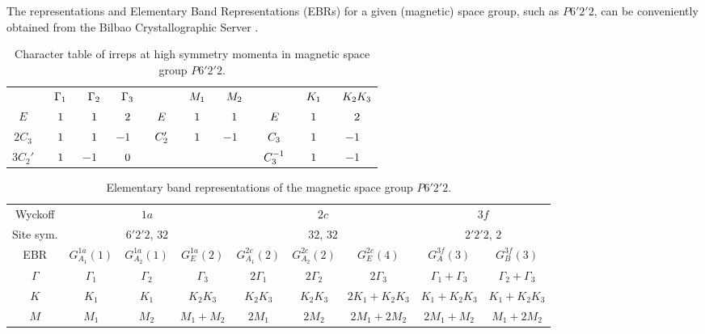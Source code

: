 \documentclass[12pt]{report}
\begin{document}
The representations and Elementary Band Representations (EBRs) for a given (magnetic) space group, such as \( P6'2'2 \), can be conveniently obtained from the Bilbao Crystallographic Server \cite{bilbao_1, bilbao_2}.

\begin{table}[H]
\caption{Character table of irreps at high symmetry momenta in magnetic space group $P6'2'2$.}
\centering
\begin{tabular} { c c c c | c c c | c c c }
\cline{1-10}
$\P$ & $\P \Gamma_1$ & $\P \Gamma_2$ & $\P \Gamma_3$ & $\P$ & $\P M_1$ & $\P M_2$ & $\P$ & $\P K_1$ & $\P K_2K_3$ \\
\cline{1-10}
$E$ & $\P1$ & $\P1$ & $\P2$ & $\P E$ & $\P1$ & $\P1$ & $\P E$ & $\P1$ & $\P2$ \\
$2 C_3$ & $\P1$ & $\P1$ & $ -1$ & $\P C_2'$ & $\P1$ & $ -1$ & $\P C_3$ & $\P1$ & $ -1$ \\
$3 C_2'$ & $\P1$ & $ -1$ & $\P0$ & $\P$ & $\P$ & $\P$ & $\P C_3^{-1}$ & $\P1$ & $-1$ \\
\cline{1-10}
\end{tabular}
\label{tab:P6'2'2}
\end{table}

\begin{table}[H]
\footnotesize
\caption{Elementary band representations of the magnetic space group $P6'2'2$.}
\centering
\begin{tabular}{|c|c|c|c|c|c|c|c|c|}
\hline
Wyckoff & \multicolumn{3}{c|}{$1a$} & \multicolumn{3}{c|}{$2c$} & \multicolumn{2}{c|}{$3f$} \\
\cline{1-9}
Site sym. & \multicolumn{3}{c|}{$6'2'2$, $32$} & \multicolumn{3}{c|}{$32$, $32$} & \multicolumn{2}{c|}{$2'2'2$, $2$} \\
\cline{1-9}
EBR & $G_{A_1}^{1a}(1)$ & $G_{A_2}^{1a}(1)$ & $G_{E}^{1a}(2)$ & $G_{A_1}^{2c}(2)$ & $G_{A_2}^{2c}(2)$ & $G_{E}^{2c}(4)$   & $G_{A}^{3f}(3)$ & $G_{B}^{3f}(3)$ \\
\hline
$\Gamma$ & $\Gamma_1$ & $\Gamma_2$ & $\Gamma_3$ & $2\Gamma_1$ & $2\Gamma_2$ & $2\Gamma_3$ & $\Gamma_1+\Gamma_3$ & $\Gamma_2+\Gamma_3$ \\
\hline
$K$ & $K_1$ & $K_1$ & $K_2 K_3$ & $K_2 K_3$ & $K_2 K_3$ & $2K_1 + K_2 K_3$ & $K_1+K_2 K_3$ & $K_1+K_2 K_3$ \\
\hline
$M$ & $M_1$ & $M_2$ & $M_1+M_2$ & $2M_1$ & $2M_2$ & $2M_1+2M_2$ & $2M_1+M_2$ & $M_1+2M_2$ \\
\hline
\end{tabular}
\label{tab:matbg-irreps}
\end{table}
\end{document}
